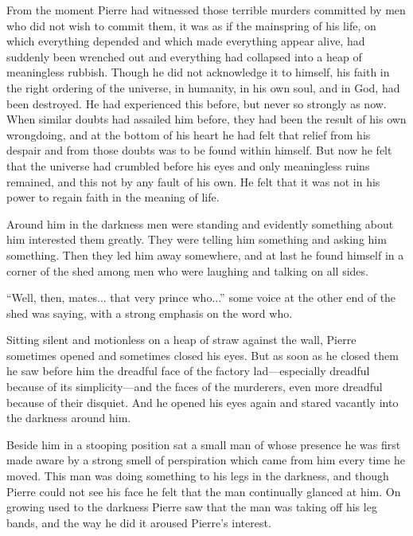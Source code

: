 From the moment Pierre had witnessed those terrible murders
committed by men who did not wish to commit them, it was as if
the mainspring of his life, on which everything depended and
which made everything appear alive, had suddenly been wrenched
out and everything had collapsed into a heap of meaningless
rubbish. Though he did not acknowledge it to himself, his faith
in the right ordering of the universe, in humanity, in his own
soul, and in God, had been destroyed. He had experienced this
before, but never so strongly as now. When similar doubts had
assailed him before, they had been the result of his own
wrongdoing, and at the bottom of his heart he had felt that
relief from his despair and from those doubts was to be found
within himself. But now he felt that the universe had crumbled
before his eyes and only meaningless ruins remained, and this not
by any fault of his own. He felt that it was not in his power to
regain faith in the meaning of life.

Around him in the darkness men were standing and evidently
something about him interested them greatly. They were telling
him something and asking him something. Then they led him away
somewhere, and at last he found himself in a corner of the shed
among men who were laughing and talking on all sides.

``Well, then, mates... that very prince who...'' some voice at
the other end of the shed was saying, with a strong emphasis on
the word who.

Sitting silent and motionless on a heap of straw against the
wall, Pierre sometimes opened and sometimes closed his eyes. But
as soon as he closed them he saw before him the dreadful face of
the factory lad---especially dreadful because of its
simplicity---and the faces of the murderers, even more dreadful
because of their disquiet. And he opened his eyes again and
stared vacantly into the darkness around him.

Beside him in a stooping position sat a small man of whose
presence he was first made aware by a strong smell of
perspiration which came from him every time he moved. This man
was doing something to his legs in the darkness, and though
Pierre could not see his face he felt that the man continually
glanced at him. On growing used to the darkness Pierre saw that
the man was taking off his leg bands, and the way he did it
aroused Pierre's interest.

